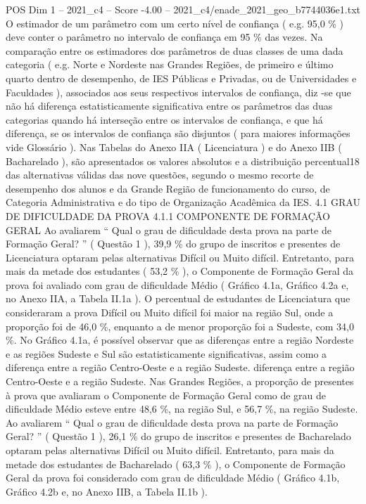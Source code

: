 \begin{textsample}{POS Dim 1 – 2021\_c4 – Score -4.00 – 2021\_c4/enade\_2021\_geo\_b7744036e1.txt}
O estimador de um parâmetro com um certo nível de confiança ( e.g. 95,0 \% ) deve conter o parâmetro no intervalo de confiança em 95 \% das vezes.
Na comparação entre os estimadores dos parâmetros de duas classes de uma dada categoria ( e.g.
Norte e Nordeste nas Grandes Regiões, de primeiro e último quarto dentro de desempenho, de IES Públicas e Privadas, ou de Universidades e Faculdades ), associados aos seus respectivos intervalos de confiança, diz -se que não há diferença estatisticamente significativa entre os parâmetros das duas categorias quando há interseção entre os intervalos de confiança, e que há diferença, se os intervalos de confiança são disjuntos ( para maiores informações vide Glossário ).
Nas Tabelas do Anexo IIA ( Licenciatura ) e do Anexo IIB ( Bacharelado ), são apresentados os valores absolutos e a distribuição percentual18 das alternativas válidas das nove questões, segundo o mesmo recorte de desempenho dos alunos e da Grande Região de funcionamento do curso, de Categoria Administrativa e do tipo de Organização Acadêmica da IES. 4.1 GRAU DE DIFICULDADE DA PROVA 4.1.1 COMPONENTE DE FORMAÇÃO GERAL Ao avaliarem “ Qual o grau de dificuldade desta prova na parte de Formação Geral? ” ( Questão 1 ), 39,9 \% do grupo de inscritos e presentes de Licenciatura optaram pelas alternativas Difícil ou Muito difícil.
Entretanto, para mais da metade dos estudantes ( 53,2 \% ), o Componente de Formação Geral da prova foi avaliado com grau de dificuldade Médio ( Gráfico 4.1a, Gráfico 4.2a e, no Anexo IIA, a Tabela II.1a ).
O percentual de estudantes de Licenciatura que consideraram a prova Difícil ou Muito difícil foi maior na região Sul, onde a proporção foi de 46,0 \%, enquanto a de menor proporção foi a Sudeste, com 34,0 \%.
No Gráfico 4.1a, é possível observar que as diferenças entre a região Nordeste e as regiões Sudeste e Sul são estatisticamente significativas, assim como a diferença entre a região Centro-Oeste e a região Sudeste. diferença entre a região Centro-Oeste e a região Sudeste.
Nas Grandes Regiões, a proporção de presentes à prova que avaliaram o Componente de Formação Geral como de grau de dificuldade Médio esteve entre 48,6 \%, na região Sul, e 56,7 \%, na região Sudeste.
Ao avaliarem “ Qual o grau de dificuldade desta prova na parte de Formação Geral? ” ( Questão 1 ), 26,1 \% do grupo de inscritos e presentes de Bacharelado optaram pelas alternativas Difícil ou Muito difícil.
Entretanto, para mais da metade dos estudantes de Bacharelado ( 63,3 \% ), o Componente de Formação Geral da prova foi considerado com grau de dificuldade Médio ( Gráfico 4.1b, Gráfico 4.2b e, no Anexo IIB, a Tabela II.1b ).

\end{textsample}
